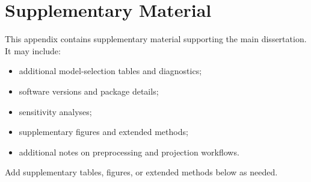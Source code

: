 \chapter{Supplementary Material}

This appendix contains supplementary material supporting the main dissertation. It may include:
  
  \begin{itemize}
\item additional model-selection tables and diagnostics;
\item software versions and package details;
\item sensitivity analyses;
\item supplementary figures and extended methods;
\item additional notes on preprocessing and projection workflows.
\end{itemize}

Add supplementary tables, figures, or extended methods below as needed.